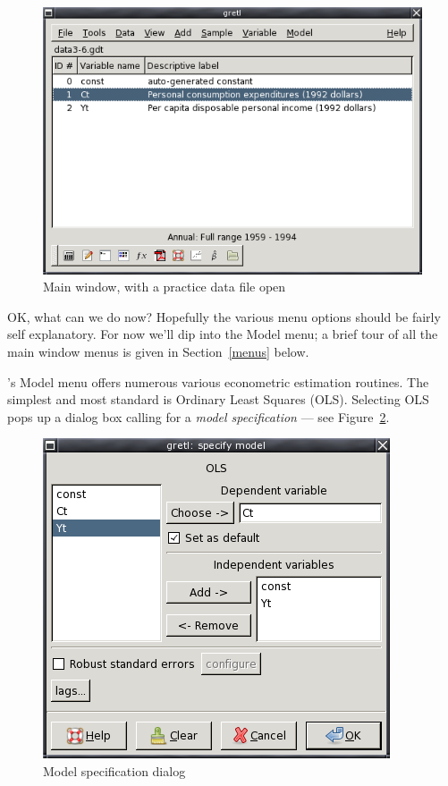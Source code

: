 \begin{figure}[htbp]
  \begin{center}
    \includegraphics[scale=0.5]{figures/mainwin}
  \end{center}
  \caption{Main window, with a practice data file open}
  \label{fig-mainwin}
\end{figure}

OK, what can we do now?  Hopefully the various menu options should be
fairly self explanatory.  For now we'll dip into the Model menu; a
brief tour of all the main window menus is given in
Section~\ref{menus} below.
    
's Model menu offers numerous various econometric
estimation routines.  The simplest and most standard is Ordinary Least
Squares (OLS). Selecting OLS pops up a dialog box calling for a
\emph{model specification} --- see Figure~\ref{fig-selector}.
    
\begin{figure}[htbp]
  \begin{center}
    \includegraphics[scale=0.5]{figures/selector}
  \end{center}
  \caption{Model specification dialog}
  \label{fig-selector}
\end{figure}

